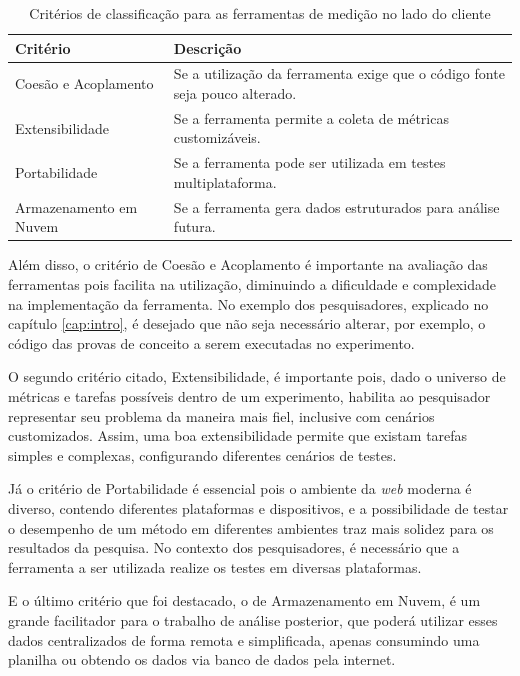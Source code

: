 \documentclass[12pt]{tcc}
\begin{document}
	\begin{table}[H]
		\centering
		\caption{Critérios de classificação para as ferramentas de medição no lado do cliente}
		\begin{tabular}{lp{8.5cm}}
			\toprule
			\textbf{Critério} & \textbf{Descrição}\\
			\midrule 
			Coesão e Acoplamento & Se a utilização da ferramenta exige que o código fonte seja pouco alterado.\\
			Extensibilidade & Se a ferramenta permite a coleta de métricas customizáveis.\\
			Portabilidade & Se a ferramenta pode ser utilizada em testes multiplataforma.\\
			Armazenamento em Nuvem & Se a ferramenta gera dados estruturados para análise futura.\\
			\bottomrule
		\end{tabular}
		\label{tab:criterio-avaliacao-ferramentas}
	\end{table}

	Além disso, o critério de Coesão e Acoplamento é importante na avaliação das ferramentas pois facilita na utilização, diminuindo a dificuldade e complexidade na implementação da ferramenta. No exemplo dos pesquisadores, explicado no capítulo \ref{cap:intro}, é desejado que não seja necessário alterar, por exemplo, o código das provas de conceito a serem executadas no experimento. 
	
	O segundo critério citado, Extensibilidade, é importante pois, dado o universo de métricas e tarefas possíveis dentro de um experimento, habilita ao pesquisador representar seu problema da maneira mais fiel, inclusive com cenários customizados. Assim, uma boa extensibilidade permite que existam tarefas simples e complexas, configurando diferentes cenários de testes.
	
	Já o critério de Portabilidade é essencial pois o ambiente da \emph{web} moderna é diverso, contendo diferentes plataformas e dispositivos, e a possibilidade de testar o desempenho de um método em diferentes ambientes traz mais solidez para os resultados da pesquisa. No contexto dos pesquisadores, é necessário que a ferramenta a ser utilizada realize os testes em diversas plataformas.
	
	E o último critério que foi destacado, o de Armazenamento em Nuvem, é um grande facilitador para o trabalho de análise posterior, que poderá utilizar esses dados centralizados de forma remota e simplificada, apenas consumindo uma planilha ou obtendo os dados via banco de dados pela internet.
\end{document}
